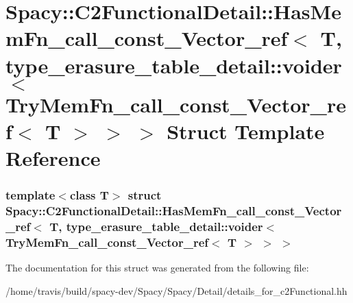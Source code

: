 \hypertarget{structSpacy_1_1C2FunctionalDetail_1_1HasMemFn__call__const__Vector__ref_3_01T_00_01type__erasuree7dc8e568b6d47cc200a728c09a845e2}{\section{\-Spacy\-:\-:\-C2\-Functional\-Detail\-:\-:\-Has\-Mem\-Fn\-\_\-call\-\_\-const\-\_\-\-Vector\-\_\-ref$<$ \-T, type\-\_\-erasure\-\_\-table\-\_\-detail\-:\-:voider$<$ \-Try\-Mem\-Fn\-\_\-call\-\_\-const\-\_\-\-Vector\-\_\-ref$<$ \-T $>$ $>$ $>$ \-Struct \-Template \-Reference}
\label{structSpacy_1_1C2FunctionalDetail_1_1HasMemFn__call__const__Vector__ref_3_01T_00_01type__erasuree7dc8e568b6d47cc200a728c09a845e2}
}
\subsubsection*{template$<$class T$>$ struct Spacy\-::\-C2\-Functional\-Detail\-::\-Has\-Mem\-Fn\-\_\-call\-\_\-const\-\_\-\-Vector\-\_\-ref$<$ T, type\-\_\-erasure\-\_\-table\-\_\-detail\-::voider$<$ Try\-Mem\-Fn\-\_\-call\-\_\-const\-\_\-\-Vector\-\_\-ref$<$ T $>$ $>$ $>$}



\-The documentation for this struct was generated from the following file\-:\begin{DoxyCompactItemize}
\item 
/home/travis/build/spacy-\/dev/\-Spacy/\-Spacy/\-Detail/details\-\_\-for\-\_\-c2\-Functional.\-hh\end{DoxyCompactItemize}
